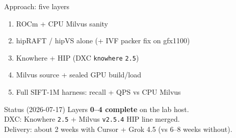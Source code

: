 \documentclass[aspectratio=169,11pt]{beamer}
\begin{document}
\begin{frame}{Approach: five layers}
  \begin{enumerate}
    \item[\textbf{0}] ROCm + CPU Milvus sanity
    \item[\textbf{1}] hipRAFT / hipVS alone (+ IVF packer fix on gfx1100)
    \item[\textbf{2}] Knowhere + HIP (DXC \texttt{knowhere} \texttt{2.5})
    \item[\textbf{3}] Milvus source + sealed GPU build/load
    \item[\textbf{4}] Full SIFT-1M harness: recall + QPS vs CPU Milvus
  \end{enumerate}

  \vspace{0.6em}
  \begin{exampleblock}{Status (2026-07-17)}
    Layers \textbf{0--4 complete} on the lab host.\\
    DXC: Knowhere \texttt{2.5} + Milvus \texttt{v2.5.4} HIP line merged.\\
    Delivery: about 2 weeks with Cursor + Grok 4.5 (vs 6--8 weeks without).
  \end{exampleblock}
\end{frame}
\end{document}
